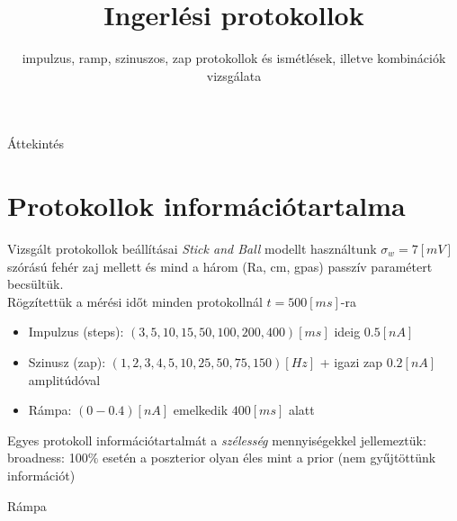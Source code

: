 \documentclass{beamer}
\title{Ingerlési protokollok} %
\subtitle{impulzus, ramp, szinuszos, zap protokollok és ismétlések, illetve kombinációk vizsgálata} %
\author{}
\begin{document}
  \frame{\maketitle}


\begin{darkframes}
	\begin{frame}{Áttekintés}
		\tableofcontents
	\end{frame}
	
	\section{Protokollok információtartalma}
	
	\begin{frame}{Vizsgált protokollok beállításai}
	\textit{Stick and Ball} modellt használtunk $\sigma_w = 7\left[mV\right]$ szórású fehér zaj mellett és mind a három (Ra, cm, gpas) passzív paramétert becsültük. \\
	Rögzítettük a mérési időt minden protokollnál $t=500\left[ms\right]$-ra
		\begin{itemize}
			\item \alert{Impulzus (steps)}: $\left(3, 5, 10, 15, 50, 100, 200, 400\right) \left[ms\right]$ ideig $0.5\left[nA\right]$
			\item \alert{Szinusz (zap)}: $\left(1, 2, 3, 4, 5, 10, 25, 50, 75, 150\right) \left[Hz\right]$ + igazi zap $0.2\left[nA\right]$ amplitúdóval
			\item \alert{Rámpa}: $\left(0-0.4\right)\left[nA\right]$ emelkedik $400\left[ms\right]$ alatt
		\end{itemize}
	Egyes protokoll információtartalmát a \textit{szélesség} mennyiségekkel jellemeztük: \\
	\alert{broadness}: 100$\%$ esetén a poszterior olyan éles mint a prior (nem gyűjtöttünk információt)
	\end{frame}
	
	\begin{frame}
		\begin{center}
			\Large \alert{Rámpa}
		\end{center}
	\end{frame}
	

\end{darkframes}
\end{document}
